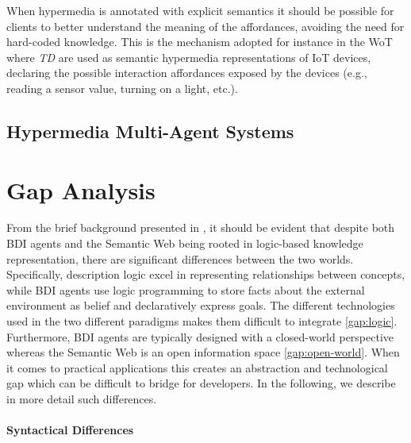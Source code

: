 \documentclass[
]{ceurart}
\begin{document}
When hypermedia is annotated with explicit semantics it should be possible for clients to better understand the meaning of the affordances, avoiding the need for hard-coded knowledge.
%
This is the mechanism adopted for instance in the \ac{WoT}~\cite{wotarch} where \emph{\ac{TD}} are used as semantic hypermedia representations of \ac{IoT} devices,
declaring the possible interaction affordances exposed by the devices (e.g., reading a sensor value, turning on a light, etc.).


\subsection{Hypermedia Multi-Agent Systems}


\section{Gap Analysis}
\label{sec:gap-analysis}

From the brief background presented in , 
it should be evident that
despite both \ac{BDI} agents and the Semantic Web being rooted in logic-based knowledge representation,
there are significant differences between the two worlds.
Specifically, description logic excel in representing relationships between concepts, while \ac{BDI} agents use logic programming to store facts about the external environment as belief and declaratively express goals.
The different technologies used in the two different paradigms makes them difficult to integrate \ref{gap:logic}.
%
Furthermore, \ac{BDI} agents are typically designed with a closed-world perspective whereas the Semantic Web is an open information space \ref{gap:open-world}.
%
When it comes to practical applications this creates an abstraction and technological gap
which can be difficult to bridge for developers.
%
In the following, we describe in more detail such differences.

\paragraph{Syntactical Differences}
\end{document}
